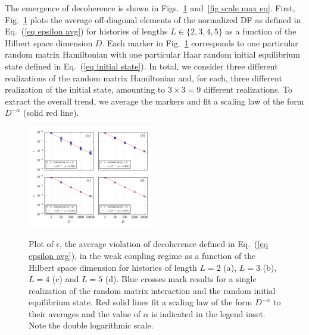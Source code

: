 \documentclass[pre,onecolumn,12pt,aps,longbibliography,nofootinbib]{revtex4-2}
\newcommand{\new}[1]{#1}
\begin{document}
The emergence of \new{decoherence} is shown in Figs.~\ref{fig scale avg eq} and~\ref{fig scale max eq}. First,
Fig.~\ref{fig scale avg eq} plots the average off-diagonal elements of the normalized DF as defined in
Eq.~(\ref{eq epsilon avg}) for histories of lengths $L\in\{2,3,4,5\}$ as a function of the Hilbert space dimension $D$.
Each marker in Fig.~\ref{fig scale avg eq} corresponds to one particular random matrix Hamiltonian with one particular
Haar random initial equilibrium state defined in Eq.~(\ref{eq initial state}). In total, we consider three different
realizations of the random matrix Hamiltonian and, for each, three different realization of the initial state, amounting
to $3\times3=9$ different realizations. To extract the overall trend, we average the markers and fit a scaling law of the
form $D^{-\alpha}$ (solid red line).

\begin{figure}[t]
 \centering\includegraphics[width=0.49\textwidth,clip=true]{eps_001_eq.pdf}
 \label{fig scale avg eq}\vspace{-0.5cm}
 \caption{Plot of $\epsilon$, the average violation of decoherence defined in Eq.~(\ref{eq epsilon avg}), in the weak coupling regime as a function of the Hilbert space dimension for histories of length $L=2$ (a), $L=3$ (b), $L=4$ (c) and $L=5$ (d). Blue crosses mark results for a single realization of the random matrix interaction and the random initial equilibrium state. Red solid lines fit a scaling law of the form $D^{-\alpha}$ to their averages and the value of $\alpha$ is indicated in the legend inset. Note the double logarithmic scale. }
\end{figure}
\end{document}
